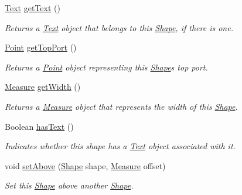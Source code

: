\begin{DoxyCompactItemize}
\hyperlink{classcom_1_1aarrelaakso_1_1drawl_1_1_text}{Text} \hyperlink{classcom_1_1aarrelaakso_1_1drawl_1_1_shape_a6f876978d4102974fedc5b41c93c7b26}{get\+Text} ()
\begin{DoxyCompactList}\small\item\em Returns a \hyperlink{classcom_1_1aarrelaakso_1_1drawl_1_1_text}{Text} object that belongs to this \hyperlink{classcom_1_1aarrelaakso_1_1drawl_1_1_shape}{Shape}, if there is one. \end{DoxyCompactList}\item 
\hyperlink{classcom_1_1aarrelaakso_1_1drawl_1_1_point}{Point} \hyperlink{classcom_1_1aarrelaakso_1_1drawl_1_1_shape_aed4e9caa294aacc973b7a531a960e9e5}{get\+Top\+Port} ()
\begin{DoxyCompactList}\small\item\em Returns a \hyperlink{classcom_1_1aarrelaakso_1_1drawl_1_1_point}{Point} object representing this \hyperlink{classcom_1_1aarrelaakso_1_1drawl_1_1_shape}{Shape}\textquotesingle{}s top port. \end{DoxyCompactList}\item 
\hyperlink{classcom_1_1aarrelaakso_1_1drawl_1_1_measure}{Measure} \hyperlink{classcom_1_1aarrelaakso_1_1drawl_1_1_shape_a3e2c58984f1bcbc2e9e86cf30868561e}{get\+Width} ()
\begin{DoxyCompactList}\small\item\em Returns a \hyperlink{classcom_1_1aarrelaakso_1_1drawl_1_1_measure}{Measure} object that represents the width of this \hyperlink{classcom_1_1aarrelaakso_1_1drawl_1_1_shape}{Shape}. \end{DoxyCompactList}\item 
Boolean \hyperlink{classcom_1_1aarrelaakso_1_1drawl_1_1_shape_a037a5515b2a6e1df1d1981aa5516e78e}{has\+Text} ()
\begin{DoxyCompactList}\small\item\em Indicates whether this shape has a \hyperlink{classcom_1_1aarrelaakso_1_1drawl_1_1_text}{Text} object associated with it. \end{DoxyCompactList}\item 
void \hyperlink{classcom_1_1aarrelaakso_1_1drawl_1_1_shape_aab165a65f7bd1e55a6de7166577725a3}{set\+Above} (\hyperlink{classcom_1_1aarrelaakso_1_1drawl_1_1_shape}{Shape} shape, \hyperlink{classcom_1_1aarrelaakso_1_1drawl_1_1_measure}{Measure} offset)
\begin{DoxyCompactList}\small\item\em Set this \hyperlink{classcom_1_1aarrelaakso_1_1drawl_1_1_shape}{Shape} above another \hyperlink{classcom_1_1aarrelaakso_1_1drawl_1_1_shape}{Shape}. \end{DoxyCompactList}\item 

\end{DoxyCompactItemize}
